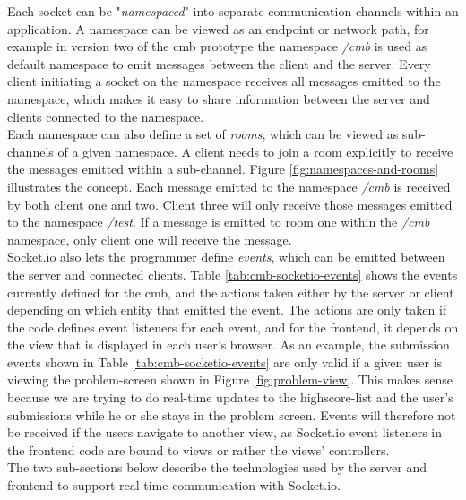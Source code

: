 Each socket can be "\textit{namespaced}" into separate communication channels within an application. A namespace can be viewed as an endpoint or network path, for example in version two of the \gls{cmb} prototype the namespace \textit{/cmb} is used as default namespace to emit messages between the client and the server. Every client initiating a socket on the namespace receives all messages emitted to the namespace, which makes it easy to share information between the server and clients connected to the namespace. \\

Each namespace can also define a set of \textit{rooms}, which can be viewed as sub-channels of a given namespace. A client needs to join a room explicitly to receive the messages emitted within a sub-channel. Figure \ref{fig:namespaces-and-rooms} illustrates the concept. Each message emitted to the namespace \textit{/cmb} is received by both client one and two. Client three will only receive those messages emitted to the namespace \textit{/test}. If a message is emitted to room one within the \textit{/cmb} namespace, only client one will receive the message. \\

Socket.io also lets the programmer define \textit{events}, which can be emitted between the server and connected clients. Table \ref{tab:cmb-socketio-events} shows the events currently defined for the \gls{cmb}, and the actions taken either by the server or client depending on which entity that emitted the event. The actions are only taken if the code defines event listeners for each event, and for the frontend, it depends on the view that is displayed in each user's browser. As an example, the submission events shown in Table \ref{tab:cmb-socketio-events} are only valid if a given user is viewing the problem-screen shown in Figure \ref{fig:problem-view}. This makes sense because we are trying to do real-time updates to the highscore-list and the user’s submissions while he or she stays in the problem screen. Events will therefore not be received if the users navigate to another view, as Socket.io event listeners in the frontend code are bound to views or rather the views’ controllers.  \\

The two sub-sections below describe the technologies used by the server and frontend to support real-time communication with Socket.io.

